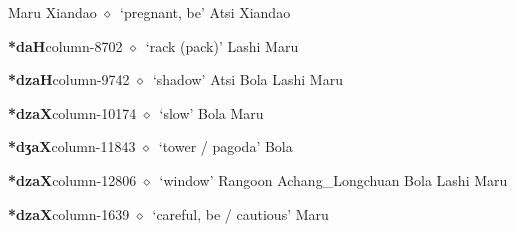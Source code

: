 \hspace{1ex}
         Maru 
\hspace{1ex}
         Xiandao 
\hspace{1ex}
         $\diamond$~`pregnant, be'
         Atsi 
\hspace{1ex}
         Xiandao 
  \item {\footnotesize \textbf{*daH}}{\tiny column-8702}
         $\diamond$~`rack (pack)'
         Lashi 
\hspace{1ex}
         Maru 
  \item {\footnotesize \textbf{*dzaH}}{\tiny column-9742}
         $\diamond$~`shadow'
         Atsi 
\hspace{1ex}
         Bola 
\hspace{1ex}
         Lashi 
\hspace{1ex}
         Maru 
  \item {\footnotesize \textbf{*dzaX}}{\tiny column-10174}
         $\diamond$~`slow'
         Bola 
\hspace{1ex}
         Maru 
  \item {\footnotesize \textbf{*dʒaX}}{\tiny column-11843}
         $\diamond$~`tower / pagoda'
         Bola 
  \item {\footnotesize \textbf{*dzaX}}{\tiny column-12806}
         $\diamond$~`window'
         Rangoon 
\hspace{1ex}
         Achang\_Longchuan 
\hspace{1ex}
         Bola 
\hspace{1ex}
         Lashi 
\hspace{1ex}
         Maru 
  \item {\footnotesize \textbf{*dzaX}}{\tiny column-1639}
         $\diamond$~`careful, be / cautious'
         Maru 
